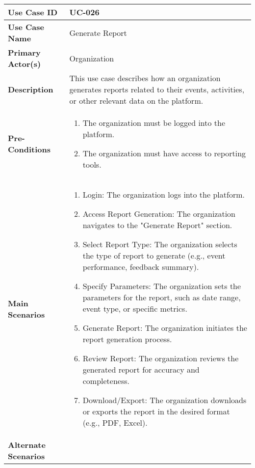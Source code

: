 \begin{table}[!ht]
    \centering
    \renewcommand{\arraystretch}{1.3} %
    \begin{tabularx}{\textwidth}{|l|X|}
        \hline
        \textbf{Use Case ID} & UC-026 \\
        \hline
        \textbf{Use Case Name} & Generate Report \\
        \hline
        \textbf{Primary Actor(s)} & Organization \\
        \hline
        \textbf{Description} & This use case describes how an organization generates reports related to their events, activities, or other relevant data on the platform. \\
        \hline
        \textbf{Pre-Conditions} & 
        \begin{enumerate}[label=\arabic*.,itemsep=0pt]
            \item The organization must be logged into the platform.
            \item The organization must have access to reporting tools.
        \end{enumerate} \\
        \hline
        \textbf{Main Scenarios} & 
        \begin{enumerate}[label=\arabic*.,itemsep=0pt]
            \item Login: The organization logs into the platform.
            \item Access Report Generation: The organization navigates to the "Generate Report" section.
            \item Select Report Type: The organization selects the type of report to generate (e.g., event performance, feedback summary).
            \item Specify Parameters: The organization sets the parameters for the report, such as date range, event type, or specific metrics.
            \item Generate Report: The organization initiates the report generation process.
            \item Review Report: The organization reviews the generated report for accuracy and completeness.
            \item Download/Export: The organization downloads or exports the report in the desired format (e.g., PDF, Excel).
        \end{enumerate} \\
        \hline
        \textbf{Alternate Scenarios} & 

\end{tabularx}
\end{table}
